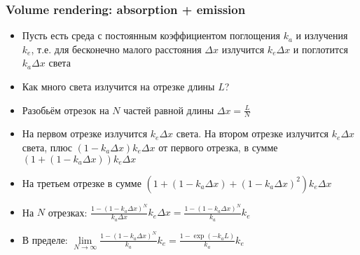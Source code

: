 \documentclass[10pt]{beamer}
\begin{document}
\begin{frame}[fragile]
\frametitle{Volume rendering: absorption + emission}
\begin{itemize}
\item Пусть есть среда с постоянным коэффициентом поглощения \begin{math}k_a\end{math} и излучения \begin{math}k_e\end{math}, т.е. для бесконечно малого расстояния \begin{math}\Delta x\end{math} излучится \begin{math}k_e \Delta x\end{math} и поглотится \begin{math}k_a \Delta x\end{math} света
\pause
\item Как много света излучится на отрезке длины \begin{math}L\end{math}?
\pause
\item Разобьём отрезок на \begin{math}N\end{math} частей равной длины \begin{math}\Delta x = \frac{L}{N}\end{math}
\pause
\item На первом отрезке излучится \begin{math}k_e \Delta x\end{math} света. На втором отрезке излучится \begin{math}k_e \Delta x\end{math} света, плюс \begin{math}(1 - k_a \Delta x) k_e \Delta x\end{math} от первого отрезка, в сумме \begin{math}\left(1 + (1 - k_a \Delta x)\right) k_e \Delta x\end{math}
\pause
\item На третьем отрезке в сумме \begin{math}\left(1 + (1 - k_a \Delta x) + (1 - k_a \Delta x)^2\right) k_e \Delta x\end{math}
\pause
\item На \begin{math}N\end{math} отрезках: \begin{math}\frac{1 - (1 - k_a \Delta x)^N}{k_a \Delta x} k_e \Delta x = \frac{1 - (1 - k_a \Delta x)^N}{k_a} k_e\end{math}
\pause
\item В пределе: \begin{math}\lim\limits_{N \rightarrow \infty} \frac{1 - (1 - k_a \Delta x)^N}{k_a} k_e = \frac{1 - \exp(-k_a L)}{k_a} k_e\end{math}
\end{itemize}
\end{frame}
\end{document}
